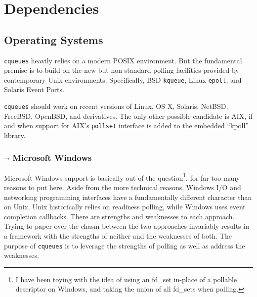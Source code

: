 \documentclass[11pt, oneside]{memoir}
\newcommand*{\cqueues}[0]{\texttt{cqueues}\xspace}
\newcommand*{\syscall}[1]{\texttt{#1}\xspace}
\begin{document}
\date{\today}
\author{William Ahern}
\maketitle
\thispagestyle{empty}
\clearpage

\setcounter{page}{1}
\tableofcontents

\clearpage

\setcounter{page}{1}


\chapter{Dependencies}

\section{Operating Systems}

\cqueues heavily relies on a modern POSIX environment. But the fundamental premise is to build on the new but non-standard polling facilities provided by contemporary Unix environments. Specifically, BSD \syscall{kqueue}, Linux \syscall{epoll}, and Solaris Event Ports.

\cqueues should work on recent versions of Linux, OS X, Solaris, NetBSD, FreeBSD, OpenBSD, and derivatives. The only other possible candidate is AIX, if and when support for AIX's \syscall{pollset} interface is added to the embedded ``kpoll'' library.

\subsection{$\lnot$ Microsoft Windows}

Microsoft Windows support is basically out of the question\footnote{I have been toying with the idea of using an fd\_set in-place of a pollable descriptor on Windows, and taking the union of all fd\_sets when polling.}, for far too many reasons to put here. Aside from the more technical reasons, Windows I/O and networking programming interfaces have a fundamentally different character than on Unix. Unix historically relies on readiness polling, while Windows uses event completion callbacks. There are strengths and weaknesses to each approach. Trying to paper over the chasm between the two approaches invariably results in a framework with the strengths of neither and the weaknesses of both. The purpose of \cqueues is to leverage the strengths of polling as well as address the weaknesses.
\end{document}
